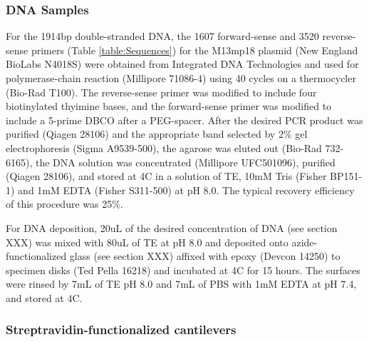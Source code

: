 \documentclass[%
  aip,12pt,tightenlines,
  amsthm,
 amsmath,amssymb
]{article}
\newcommand{\tRef}[1]{Table \ref{table:#1}}
\newcommand{\sLabel}[1]{\label{section:#1}}
\newcommand{\firstp}[0]{}
\newcommand{\pl}[0]{\vspace{6pt}}
\newcommand{\supply}[2]{(#1 #2)}
\newcommand{\degreeC}[0]{\degree{}C}
\begin{document}
\subsubsection{\sLabel{Sample}DNA Samples}

\firstp For the 1914bp double-stranded DNA, the 1607 forward-sense and 3520 reverse-sense primers (\tRef{Sequences}) for the M13mp18 plasmid \supply{New England BioLabs}{N4018S} were obtained from Integrated DNA Technologies  and used for polymerase-chain reaction \supply{Millipore}{71086-4} using 40 cycles on a thermocycler \supply{Bio-Rad}{T100}. The reverse-sense primer was modified to include four biotinylated thyimine bases, and the forward-sense primer was modified to include a 5-prime DBCO after a PEG-spacer. After the desired PCR product was purified \supply{Qiagen}{28106} and the appropriate band selected by 2\% gel electrophoresis \supply{Sigma}{A9539-500}, the agarose was eluted out \supply{Bio-Rad}{732-6165}, the DNA solution was concentrated \supply{Millipore}{UFC501096}, purified \supply{Qiagen}{28106}, and stored at 4\degreeC{} in a solution of TE, 10mM Tris \supply{Fisher}{BP151-1} and 1mM EDTA \supply{Fisher}{S311-500} at pH 8.0. The typical recovery efficiency of this procedure was 25\%. \pl 

For DNA deposition, 20uL of the desired concentration of DNA (see section XXX) was mixed with 80uL of TE at pH 8.0 and deposited onto azide-functionalized glass (see section XXX) affixed with epoxy \supply{Devcon}{14250} to specimen disks \supply{Ted Pella}{16218} and incubated at 4C for 15 hours. The surfaces were rinsed by 7mL of TE pH 8.0 and 7mL of PBS with 1mM EDTA at pH 7.4, and stored at 4\degreeC{}. 

\subsubsection{\sLabel{Cantilevers}Streptravidin-functionalized cantilevers}
\end{document}
